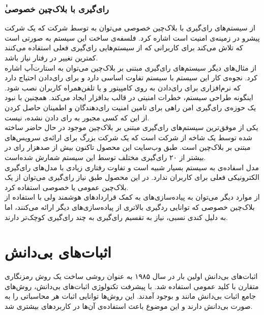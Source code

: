 \subsubsection{ٰرای‌گیری با بلاک‌چین خصوصی}
از سیستم‌های رای‌گیری با بلاک‌چین خصوصی می‌توان به 
\cite{votebook}
توسط شرکت 
که یک شرکت پیشرو در زمینه‌ی امنیت است اشاره کرد. فلسفه‌ی ساخت این سیستم به صورتی است که تلاش می‌کند برای کاربرانی که از سیستم‌هایی رای‌گیری فعلی استفاده می‌کنند کمترین تغییر در رفتار نیاز باشد. 
\\
از مثال‌های دیگر سیستم‌های رای‌گیری مبتنی بر بلاک‌چین می‌توان به استارت‌آپ 
اشاره کرد. نجوه‌ی کار این سیستم با سیستم 
تفاوت اساسی دارد و برای رای‌دادن احتیاج دارد که نرم‌‌افزاری برای رای‌دادن به روی کامپیتور و یا تلفن‌همراه کاربران نصب شود. اینگونه طراحی سیستم،‌ خطرات امنیتی در قالب بدافزار ایجاد می‌کند. همچنین با نبود یک حوزه‌ی رای‌گیری امن راهی برای تامین امنیت رای‌دهندگان و اطمینان حاصل کردن از این که کسی مجبور به رای‌ دادن نشده، نیست.
\\
یکی از موفق‌ترین سیستم‌های رای‌گیری مبتنی بر بلاک‌چین موجود در حال حاضر 
ساخته شده توسط یک شاخه از شرکت 
است که یک شرکت بزرگ برای ارائه‌ی سرویس‌های مبتنی بر بلاک‌چین است. طبق وب‌سایت این محصول تاکنون بیش از صدهزار رای در بیشتر از ۲۰ رای‌گیری مختلف توسط این سیستم‌ شمارش شده‌است. 
\\
مدل اسفاده‌ی 
به سیستم‌ 
بسیار شبیه است و تفاوت رفتاری زیادی با مدل‌های رای‌گیری الکترونیکی فعلی برای کاربران ندارد. در این محصول طبق نیاز رای‌گیری می‌توان از یک بلاک‌چین عمومی یا خصوصی استفاده کرد.
\\
از موارد دیگر می‌توان به پیاده‌سازی‌های به کمک قرارداد‌های هوشمند ولی با استفاده از بلاک‌چین خصوصی 
\cite{privblock}
که توانایی ردگیری بالاتری از پیاده‌سازی‌های دیگر ارائه می‌کنند، اما به دلیل کندی نسبی، نیاز به تقسیم رای‌گیری به چند رای‌گیری کوچک‌تر دارند.

\section{اثبات‌های بی‌دانش}
اثبات‌های بی‌دانش اولین بار در سال ۱۹۸۵ 
\cite{GHY}
به عنوان روشی ساخت یک روش رمزنگاری متقارن با کلید عمومی استفاده شد. با پیشرفت تکنولوژی اثبات‌های بی‌دانش،‌ روش‌های جامع اثبات بی‌دانش مانند
\cite{zksnark}
و  
\cite{zkstark}
بوجود آمدند. این روش‌ها توانایی اثبات هر محاسباتی را به صورت بی‌دانش دارند و این موضوع باعث استفاده‌ی آن‌ها در کاربردهای بیشتری شد.
